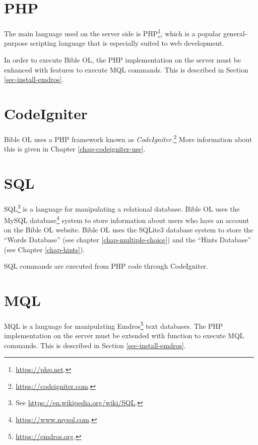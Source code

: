 \documentclass[11pt,oneside,a4paper]{memoir}
\begin{document}
\section{PHP}

The main language used on the server side is PHP\footnote{\url{https://php.net}.}, which is a popular
general-purpose scripting language that is especially suited to web development.

In order to execute Bible OL, the PHP implementation on the server must be enhanced with features to
execute MQL commands. This is described in Section \ref{sec-install-emdros}.

\section{CodeIgniter}\label{sec-codeigniter}

Bible OL uses a PHP framework known as \emph{CodeIgniter.}\footnote{\url{https://codeigniter.com}.}
More information about this is given in Chapter \ref{chap-codeigniter-use}.


\section{SQL}

SQL\footnote{See \url{https://en.wikipedia.org/wiki/SQL}.} is a language for manipulating a
relational database. Bible OL uses the MySQL database\footnote{\url{https://www.mysql.com}.} system to store
information about users who have an account on the Bible OL website. Bible OL uses the SQLite3
database system to store the ``Words Database'' (see chapter \ref{chap-multiple-choice}) and the
``Hints Database'' (see Chapter \ref{chap-hints}).

SQL commands are executed from PHP code through CodeIgniter.


\section{MQL}\label{sec-mql}

MQL is a language for manipulating Emdros\footnote{\url{https://emdros.org}.} text
databases. The PHP implementation on the server must be extended with function to execute MQL
commands. This is described in Section \ref{sec-install-emdros}.
\end{document}
